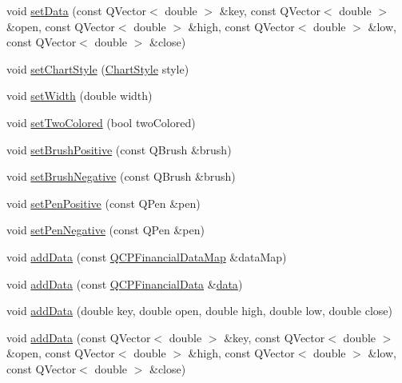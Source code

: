 \begin{DoxyCompactItemize}
\item 
void \mbox{\hyperlink{class_q_c_p_financial_a886881339d6447432af55adaad748c3c}{set\+Data}} (const Q\+Vector$<$ double $>$ \&key, const Q\+Vector$<$ double $>$ \&open, const Q\+Vector$<$ double $>$ \&high, const Q\+Vector$<$ double $>$ \&low, const Q\+Vector$<$ double $>$ \&close)
\item 
void \mbox{\hyperlink{class_q_c_p_financial_a5a59175d36279d71596e64d7bb65596f}{set\+Chart\+Style}} (\mbox{\hyperlink{class_q_c_p_financial_a0f800e21ee98d646dfc6f8f89d10ebfb}{Chart\+Style}} style)
\item 
void \mbox{\hyperlink{class_q_c_p_financial_a99633f8bac86a61d534ae5eeb1a3068f}{set\+Width}} (double width)
\item 
void \mbox{\hyperlink{class_q_c_p_financial_a138e44aac160a17a9676652e240c5f08}{set\+Two\+Colored}} (bool two\+Colored)
\item 
void \mbox{\hyperlink{class_q_c_p_financial_a5ebff2b1764efd07cc44942e67821829}{set\+Brush\+Positive}} (const Q\+Brush \&brush)
\item 
void \mbox{\hyperlink{class_q_c_p_financial_a8bbdd87629f9144b3ef51af660c0961a}{set\+Brush\+Negative}} (const Q\+Brush \&brush)
\item 
void \mbox{\hyperlink{class_q_c_p_financial_ac58aa3adc7a35aab0088764b840683e5}{set\+Pen\+Positive}} (const Q\+Pen \&pen)
\item 
void \mbox{\hyperlink{class_q_c_p_financial_afe5c07e94ccea01a75b3a2476993c346}{set\+Pen\+Negative}} (const Q\+Pen \&pen)
\item 
void \mbox{\hyperlink{class_q_c_p_financial_a1a83396f97fcc68f2b7aa8d9782feffe}{add\+Data}} (const \mbox{\hyperlink{qcustomplot_8h_a745c09823fae0974b50beca9bc3b3d7d}{Q\+C\+P\+Financial\+Data\+Map}} \&data\+Map)
\item 
void \mbox{\hyperlink{class_q_c_p_financial_a3b6144b48a6a8e63236fc5bf70d40c00}{add\+Data}} (const \mbox{\hyperlink{class_q_c_p_financial_data}{Q\+C\+P\+Financial\+Data}} \&\mbox{\hyperlink{class_q_c_p_financial_a528c81578e4f25999a9169127763cfd4}{data}})
\item 
void \mbox{\hyperlink{class_q_c_p_financial_a688bbd052e00a02954ddb0068b378170}{add\+Data}} (double key, double open, double high, double low, double close)
\item 
void \mbox{\hyperlink{class_q_c_p_financial_aa1abe3bdafb297497f09cdbdc4db3958}{add\+Data}} (const Q\+Vector$<$ double $>$ \&key, const Q\+Vector$<$ double $>$ \&open, const Q\+Vector$<$ double $>$ \&high, const Q\+Vector$<$ double $>$ \&low, const Q\+Vector$<$ double $>$ \&close)

\end{DoxyCompactItemize}
